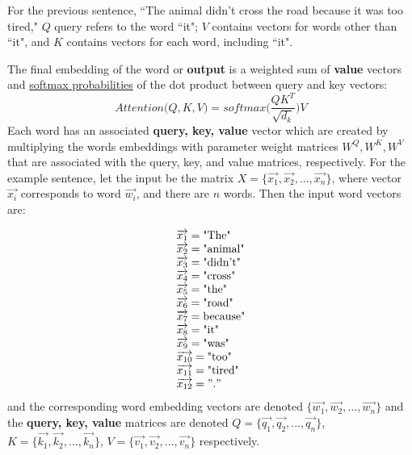For the previous sentence, ``The animal didn't cross the road because it was too tired,"  $Q$ query refers to the word ``it"; $V$ contains vectors for words other than ``it", and $K$ contains vectors for each word, including ``it". \newline

The final embedding of the word or \textbf{output} is a weighted sum of \textbf{value} vectors and \hyperref[cnc:softmaxLayer]{softmax probabilities} of the dot product between query and key vectors: 
$$
Attention \Big(Q, K, V \Big) = softmax \Bigg(\frac {QK^T} {\sqrt{d_k}} \Bigg) V
$$
Each word has an associated \textbf{query, key, value} vector which are created by multiplying the words embeddings with parameter weight matrices $W^Q, W^K, W^V$ that are associated with the query, key, and value matrices, respectively. For the example sentence, let the input be the matrix $X = \{\overrightarrow{x_1}, \overrightarrow{x_2}, ..., \overrightarrow{x_n}\}$, where vector $\overrightarrow{x_i}$ corresponds to word $\overrightarrow{w_i}$, and there are $n$ words. Then the input word vectors are: 

$$
\begin{array}{ll}
\overrightarrow{x_1} = \text{"The"} \\
\overrightarrow{x_2} = \text{"animal"} \\
\overrightarrow{x_3} = \text{"didn't"} \\
\overrightarrow{x_4} = \text{"cross"} \\
\overrightarrow{x_5} = \text{"the"} \\
\overrightarrow{x_6} = \text{"road"} \\
\overrightarrow{x_7} = \text{because"} \\
\overrightarrow{x_8} = \text{"it"} \\
\overrightarrow{x_9} = \text{"was"} \\
\overrightarrow{x_{10}} = \text{"too"} \\
\overrightarrow{x_{11}} = \text{"tired"} \\
\overrightarrow{x_{12}} = "." \\
\end{array}
$$
and the corresponding word embedding vectors are denoted $\Big\{ \overrightarrow{w_1}, \overrightarrow{w_2}, ..., \overrightarrow{w_n} \Big\}$ and the \textbf{query, key, value} matrices are denoted $Q = \Big\{\overrightarrow{q_1}, \overrightarrow{q_2}, ..., \overrightarrow{q_n} \Big\}$, $K = \Big\{\overrightarrow{k_1}, \overrightarrow{k_2}, ..., \overrightarrow{k_n} \Big\}$, $V = \Big\{\overrightarrow{v_1}, \overrightarrow{v_2}, ..., \overrightarrow{v_n} \Big\}$ respectively.


